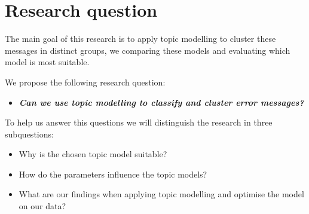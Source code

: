 \begin{comment}

Topic modelling is a hot topic in data science. System logs are used as source for the detection of problems in large computer systems. While domain experts can be used to detect and fix the problems detected, this can be difficult and time consuming. Machine learning techniques like topic modelling make it possible to develop models to extract these latent patterns from these system logs. While topic modelling is normally used in for large text corpera, recent research in the field of short text clustering and twitter tweets clustering are similar enough to by applicable for system logs. An interesting application which has not yet been touched a lot through unsupervised machine learning techniques.

\end{comment}


\section{Research question}\label{introduction:Researchquestion}
The main goal of this research is to apply topic modelling to cluster these messages in distinct groups, we comparing these models and evaluating which model is most suitable.

\noindent We propose the following research question: 
\begin{itemize}
    \item \textbf{\textit{Can we use topic modelling to classify and cluster error messages?}}
\end{itemize}

\noindent To help us answer this questions we will distinguish the research in three subquestions:
\begin{itemize}
    \item Why is the chosen topic model suitable?
    \item How do the parameters influence the topic models?
    \item What are our findings when applying topic modelling and optimise the model on our data?
\end{itemize}

\begin{comment}
What are the optimal parameters?

What are the pro's and con's of using LDA?

subquestions:
Why is LDA suitable for this type of data 

How do the parameters influence the models performance?

What are the pro's and con's of using LDA?

What other methods are available to solve this error clustering?


\end{comment}


